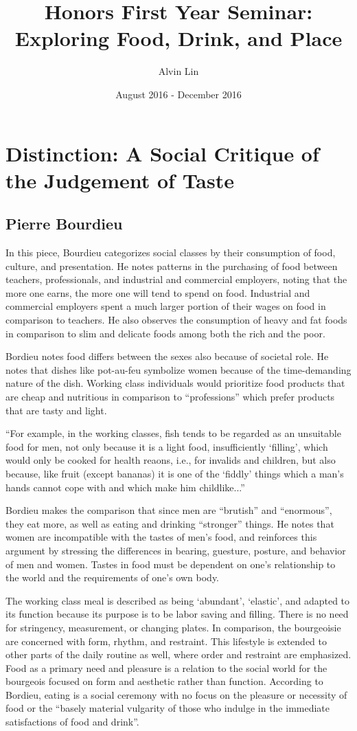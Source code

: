 \documentclass{article}
\title{Honors First Year Seminar: Exploring Food, Drink, and Place}
\author{Alvin Lin}
\date{August 2016 - December 2016}
\begin{document}
\maketitle

\section*{Distinction: A Social Critique of the Judgement of Taste}
\subsection*{Pierre Bourdieu}
In this piece, Bourdieu categorizes social classes by their consumption of food, culture, and presentation. He notes patterns in the purchasing of food between teachers, professionals, and industrial and commercial employers, noting that the more one earns, the more one will tend to spend on food. Industrial and commercial employers spent a much larger portion of their wages on food in comparison to teachers. He also observes the consumption of heavy and fat foods in comparison to slim and delicate foods among both the rich and the poor. \par
Bordieu notes food differs between the sexes also because of societal role. He notes that dishes like pot-au-feu symbolize women because of the time-demanding nature of the dish. Working class individuals would prioritize food products that are cheap and nutritious in comparison to ``professions'' which prefer products that are tasty and light. \par
``For example, in the working classes, fish tends to be regarded as an unsuitable food for men, not only because it is a light food, insufficiently `filling', which would only be cooked for health reaons, i.e., for invalids and children, but also because, like fruit (except bananas) it is one of the `fiddly' things which a man's hands cannot cope with and which make him childlike...'' \par
Bordieu makes the comparison that since men are ``brutish'' and ``enormous'', they eat more, as well as eating and drinking ``stronger'' things. He notes that women are incompatible with the tastes of men's food, and reinforces this argument by stressing the differences in bearing, guesture, posture, and behavior of men and women. Tastes in food must be dependent on one's relationship to the world and the requirements of one's own body. \par
The working class meal is described as being `abundant', `elastic', and adapted to its function because its purpose is to be labor saving and filling. There is no need for stringency, measurement, or changing plates. In comparison, the bourgeoisie are concerned with form, rhythm, and restraint. This lifestyle is extended to other parts of the daily routine as well, where order and restraint are emphasized. Food as a primary need and pleasure is a relation to the social world for the bourgeois focused on form and aesthetic rather than function. According to Bordieu, eating is a social ceremony with no focus on the pleasure or necessity of food or the ``basely material vulgarity of those who indulge in the immediate satisfactions of food and drink''.
\end{document}
